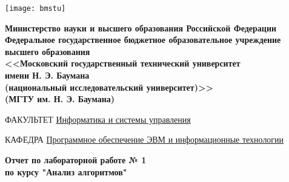 \begin{titlepage}
    \thispagestyle{empty}

    \noindent\begin{minipage}{0.05\textwidth}
        \texttt{[image: bmstu]}
    \end{minipage}
    \hfill
    \begin{minipage}{0.85\textwidth}\raggedleft
        \begin{center}
            \fontsize{10pt}{0.3\baselineskip}\selectfont \textbf{Министерство науки и высшего образования Российской Федерации \\ Федеральное государственное бюджетное образовательное учреждение \\ высшего образования \\ <<Московский государственный технический университет \\ имени Н. Э. Баумана \\ (национальный исследовательский университет)>> \\ (МГТУ им. Н. Э. Баумана)}
        \end{center}
    \end{minipage}

    \begin{center}
        \fontsize{12pt}{0.1\baselineskip}\selectfont
        \noindent\makebox[\linewidth]{\rule{\textwidth}{4pt}} \makebox[\linewidth]{\rule{\textwidth}{1pt}}
    \end{center}

    \begin{flushleft}
        \fontsize{12pt}{0.8\baselineskip}\selectfont

        ФАКУЛЬТЕТ \uline{
            \hfill
            Информатика и системы управления
            \hfill}

        КАФЕДРА \uline{\mbox{\hspace{4mm}}
            \hfill
            Программное обеспечение ЭВМ и информационные технологии
            \hfill}
    \end{flushleft}

    \vfill
    
    \begin{center}
        \fontsize{19pt}{\baselineskip}\selectfont
        \textbf{Отчет по лабораторной работе № 1} \\
        \textbf{по курсу "Анализ алгоритмов"}
    \end{center}

    \vfill
    

\end{titlepage}
